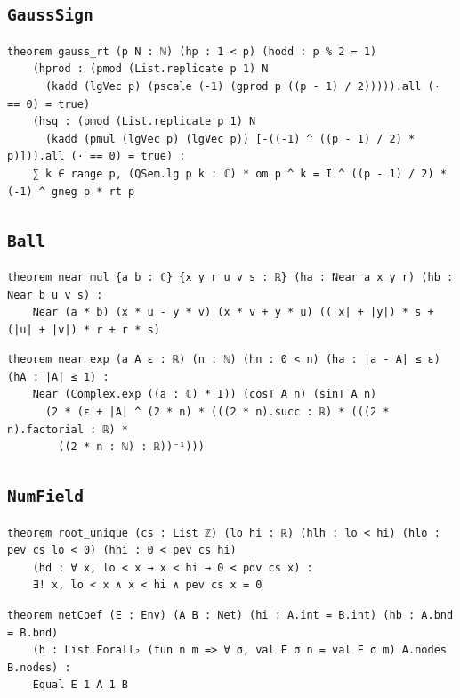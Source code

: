 \subsection{\texttt{GaussSign}}
\begin{lstlisting}[style=leancore]
theorem gauss_rt (p N : ℕ) (hp : 1 < p) (hodd : p % 2 = 1)
    (hprod : (pmod (List.replicate p 1) N
      (kadd (lgVec p) (pscale (-1) (gprod p ((p - 1) / 2))))).all (· == 0) = true)
    (hsq : (pmod (List.replicate p 1) N
      (kadd (pmul (lgVec p) (lgVec p)) [-((-1) ^ ((p - 1) / 2) * p)])).all (· == 0) = true) :
    ∑ k ∈ range p, (QSem.lg p k : ℂ) * om p ^ k = I ^ ((p - 1) / 2) * (-1) ^ gneg p * rt p
\end{lstlisting}

\subsection{\texttt{Ball}}
\begin{lstlisting}[style=leancore]
theorem near_mul {a b : ℂ} {x y r u v s : ℝ} (ha : Near a x y r) (hb : Near b u v s) :
    Near (a * b) (x * u - y * v) (x * v + y * u) ((|x| + |y|) * s + (|u| + |v|) * r + r * s)
\end{lstlisting}
\begin{lstlisting}[style=leancore]
theorem near_exp (a A ε : ℝ) (n : ℕ) (hn : 0 < n) (ha : |a - A| ≤ ε) (hA : |A| ≤ 1) :
    Near (Complex.exp ((a : ℂ) * I)) (cosT A n) (sinT A n)
      (2 * (ε + |A| ^ (2 * n) * (((2 * n).succ : ℝ) * (((2 * n).factorial : ℝ) *
        ((2 * n : ℕ) : ℝ))⁻¹)))
\end{lstlisting}

\subsection{\texttt{NumField}}
\begin{lstlisting}[style=leancore]
theorem root_unique (cs : List ℤ) (lo hi : ℝ) (hlh : lo < hi) (hlo : pev cs lo < 0) (hhi : 0 < pev cs hi)
    (hd : ∀ x, lo < x → x < hi → 0 < pdv cs x) :
    ∃! x, lo < x ∧ x < hi ∧ pev cs x = 0
\end{lstlisting}
\begin{lstlisting}[style=leancore]
theorem netCoef (E : Env) (A B : Net) (hi : A.int = B.int) (hb : A.bnd = B.bnd)
    (h : List.Forall₂ (fun n m => ∀ σ, val E σ n = val E σ m) A.nodes B.nodes) :
    Equal E 1 A 1 B
\end{lstlisting}

